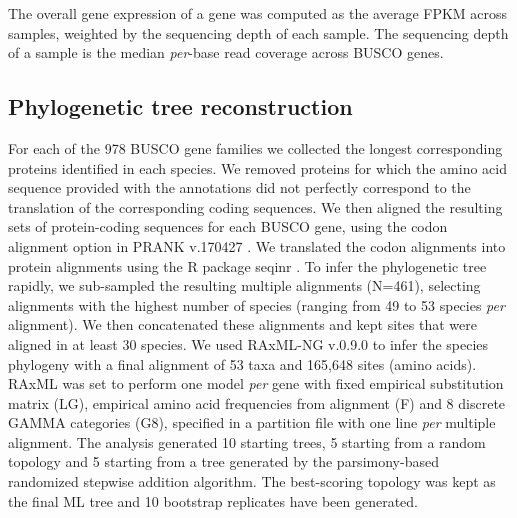 The overall gene expression of a gene was computed as the average FPKM across samples, weighted by the sequencing depth of each sample. The sequencing depth of a sample is the median \textit{per}-base read coverage across \acrshort{BUSCO} genes.

\subsection{Phylogenetic tree reconstruction}
For each of the 978 \acrshort{BUSCO} gene families we collected the longest corresponding proteins identified in each species. We removed proteins for which the amino acid sequence provided with the annotations did not perfectly correspond to the translation of the corresponding coding sequences. We then aligned the resulting sets of protein-coding sequences for each \acrshort{BUSCO} gene, using the codon alignment option in PRANK v.170427 \citep{loytynoja_phylogeny-aware_2008}. We translated the codon alignments into protein alignments using the R package seqinr \citep{charif_seqinr_2007}.
To infer the phylogenetic tree rapidly, we sub-sampled the resulting multiple alignments (N=461), selecting alignments with the highest number of species (ranging from 49 to 53 species \textit{per} alignment). We then concatenated these alignments and kept sites that were aligned in at least 30 species. We used RAxML-NG v.0.9.0 \citep{kozlov_raxml-ng_2019} to infer the species phylogeny with a final alignment of 53 taxa and 165,648 sites (amino acids). RAxML was set to perform one model \textit{per} gene with fixed empirical \gls{substitution} matrix (LG), empirical amino acid frequencies from alignment (F) and 8 discrete GAMMA categories (G8), specified in a partition file with one line \textit{per} multiple alignment. The analysis generated 10 starting trees, 5 starting from a random topology and 5 starting from a tree generated by the parsimony-based randomized stepwise addition algorithm. The best-scoring topology was kept as the final ML tree and 10 bootstrap replicates have been generated.

